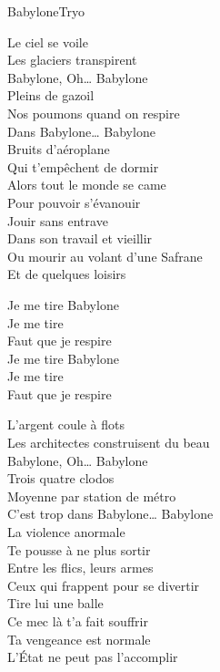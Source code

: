 \documentclass[a4paper,11pt,french]{article}
\begin{document}
\begin{Song}{Babylone}{Tryo}
\begin{multicols}{2}

\begin{Verse}
Le ciel se voile\\
Les glaciers transpirent\\
Babylone, Oh… Babylone\\
Pleins de gazoil\\
Nos poumons quand on respire\\
Dans Babylone… Babylone\\
Bruits d'aéroplane\\
Qui t'empêchent de dormir\\
Alors tout le monde se came\\
Pour pouvoir s'évanouir\\
Jouir sans entrave\\
Dans son travail et vieillir\\
Ou mourir au volant d'une Safrane\\
Et de quelques loisirs\\
\end{Verse}
\espaceInterStrophe

\begin{Chorus}
Je me tire  Babylone\\
Je me tire \\
Faut que je respire\\
Je me tire  Babylone\\
Je me tire \\
Faut que je respire\\
\end{Chorus}
\espaceInterStrophe

\begin{Verse}
L'argent coule à flots\\
Les architectes construisent du beau\\
Babylone, Oh… Babylone\\
Trois quatre clodos\\
Moyenne par station de métro\\
C'est trop dans Babylone… Babylone\\
La violence anormale\\
Te pousse à ne plus sortir\\
Entre les flics, leurs armes\\
Ceux qui frappent pour se divertir\\
Tire lui une balle\\
Ce mec là t'a fait souffrir\\
Ta vengeance est normale\\
L'État ne peut pas l'accomplir\\
\end{Verse}
\espaceInterStrophe


\end{multicols}
\end{Song}
\end{document}
